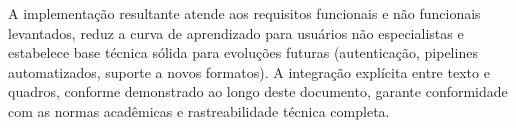 \documentclass[12pt,a4paper]{article}
\begin{document}
A implementação resultante atende aos requisitos funcionais e não funcionais levantados, reduz a curva de aprendizado para usuários não especialistas e estabelece base técnica sólida para evoluções futuras (autenticação, pipelines automatizados, suporte a novos formatos). A integração explícita entre texto e quadros, conforme demonstrado ao longo deste documento, garante conformidade com as normas acadêmicas e rastreabilidade técnica completa.
\end{document}
